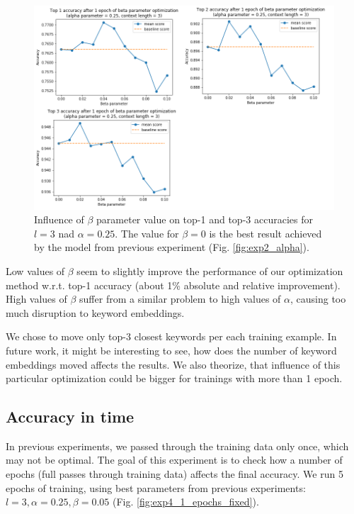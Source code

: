 \documentclass{llncs}
\begin{document}
\begin{figure}
    \centering
    \caption{Influence of \(\beta\) parameter value on top-1 and top-3 accuracies for \(l=3\) nad \(\alpha=0.25\). The value for \(\beta=0\) is the best result achieved by the model from previous experiment (Fig. \ref{fig:exp2_alpha}).}
    \label{fig:exp3_beta}
    \includegraphics[scale=0.7]{res/exp3_beta_top_acc.png}
\end{figure}

Low values of \(\beta\) seem to slightly improve the performance of our optimization method w.r.t. top-1 accuracy (about 1\% absolute and relative improvement).
High values of \(\beta\) suffer from a similar problem to high values of \(\alpha\), causing too much disruption to keyword embeddings.

We chose to move only top-3 closest keywords per each training example. In future work, it might be interesting to see, how does the number of keyword embeddings moved affects the results. We also theorize, that influence of this particular optimization could be bigger for trainings with more than 1 epoch.

\subsection{Accuracy in time}
In previous experiments, we passed through the training data only once, which may not be optimal.
The goal of this experiment is to check how a number of epochs (full passes through training data) affects the final accuracy.
We run 5 epochs of training, using best parameters from previous experiments: \(l=3, \alpha=0.25, \beta=0.05\) (Fig. \ref{fig:exp4_1_epochs_fixed}).
\end{document}
